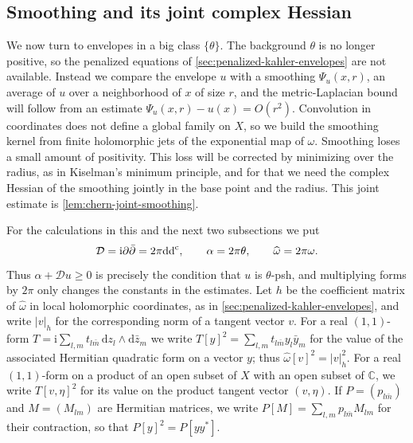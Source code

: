 \subsection{Smoothing and its joint complex Hessian}
\label{sec:chern-envelope-smoothing}
We now turn to envelopes in a big class $\{\theta\}$. The background $\theta$ is no longer positive, so the penalized equations of \cref{sec:penalized-kahler-envelopes} are not available. Instead we compare the envelope $u$ with a smoothing $\Psi_u(x,r)$, an average of $u$ over a neighborhood of $x$ of size $r$, and the metric-Laplacian bound will follow from an estimate $\Psi_u(x,r)-u(x)=O(r^2)$. Convolution in coordinates does not define a global family on $X$, so we build the smoothing kernel from finite holomorphic jets of the exponential map of $\omega$. Smoothing loses a small amount of positivity. This loss will be corrected by minimizing over the radius, as in Kiselman's minimum principle, and for that we need the complex Hessian of the smoothing jointly in the base point and the radius. This joint estimate is \cref{lem:chern-joint-smoothing}.

For the calculations in this and the next two subsections we put
\[
 \mathcal D=\mathrm i\partial\bar\partial=2\pi\mathrm{dd}^{\mathrm{c}},
 \qquad \alpha=2\pi\theta,\qquad \widehat\omega=2\pi\omega.
\]
Thus $\alpha+\mathcal Du\geq0$ is precisely the condition that $u$ is $\theta$-psh, and multiplying forms by $2\pi$ only changes the constants in the estimates. Let $h$ be the coefficient matrix of $\widehat\omega$ in local holomorphic coordinates, as in \cref{sec:penalized-kahler-envelopes}, and write $|v|_h$ for the corresponding norm of a tangent vector $v$. For a real $(1,1)$-form $T=\mathrm i\sum_{l,m}t_{l\bar m}\,\mathrm dz_l\wedge\mathrm d\bar z_m$ we write $T[y]^2=\sum_{l,m}t_{l\bar m}y_l\bar y_m$ for the value of the associated Hermitian quadratic form on a vector $y$; thus $\widehat\omega[v]^2=|v|_h^2$. For a real $(1,1)$-form on a product of an open subset of $X$ with an open subset of $\mathbb C$, we write $T[v,\eta]^2$ for its value on the product tangent vector $(v,\eta)$. If $P=(p_{l\bar m})$ and $M=(M_{lm})$ are Hermitian matrices, we write $P[M]=\sum_{l,m}p_{l\bar m}M_{lm}$ for their contraction, so that $P[y]^2=P[yy^*]$.

